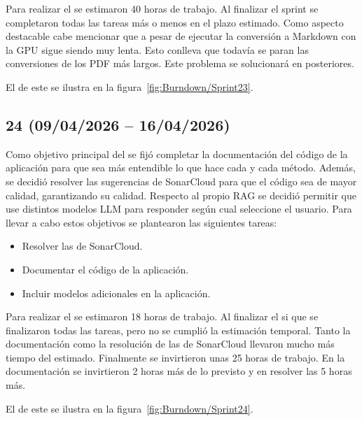 Para realizar el  se estimaron 40 horas de trabajo. Al finalizar el sprint se completaron todas las tareas más o menos en el plazo estimado. Como aspecto destacable cabe mencionar que a pesar de ejecutar la conversión a Markdown con la GPU sigue siendo muy lenta. Esto conlleva que todavía se paran las conversiones de los PDF más largos. Este problema se solucionará en  posteriores.

El  de este  se ilustra en la figura~\ref{fig:Burndown/Sprint23}.

\subsection{ 24 (09/04/2026 -- 16/04/2026)}
Como objetivo principal del  se fijó completar la documentación del código de la aplicación para que sea más entendible lo que hace cada  y cada método. Además, se decidió resolver las sugerencias de SonarCloud para que el código sea de mayor calidad, garantizando su calidad. Respecto al propio RAG se decidió permitir que use distintos modelos LLM para responder según cual seleccione el usuario. Para llevar a cabo estos objetivos se plantearon las siguientes tareas:

\begin{itemize}
\tightlist
	\item Resolver las  de SonarCloud.
	\item Documentar el código de la aplicación.
	\item Incluir modelos adicionales en la aplicación.
\end{itemize}

Para realizar el  se estimaron 18 horas de trabajo. Al finalizar el  si que se finalizaron todas las tareas, pero no se cumplió la estimación temporal. Tanto la documentación como la resolución de las  de SonarCloud llevaron mucho más tiempo del estimado. Finalmente se invirtieron unas 25 horas de trabajo. En la documentación se invirtieron 2 horas más de lo previsto y en resolver las  5 horas más.  

El  de este  se ilustra en la figura~\ref{fig:Burndown/Sprint24}.

